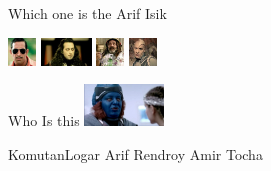 \documentclass{exam}
\begin{document}
\begin{questions}
\question Which one is the Arif Isik\newline
\begin{oneparchoices}
\CorrectChoice \includegraphics[height=2em]{arifisik.jpg}
\choice \includegraphics[height=2em]{komutanlogar.jpeg}
\choice \includegraphics[height=2em]{faruk.jpg}
\choice \includegraphics[height=2em]{216.jpg}
\end{oneparchoices}
\question Who Is this\newline
\includegraphics[height=3em]{rendroy2.jpg} \newline
\begin{oneparchoices}
\choice KomutanLogar
\choice Arif
\CorrectChoice Rendroy
\choice Amir Tocha
\end{oneparchoices}
\end{questions}
\end{document}

